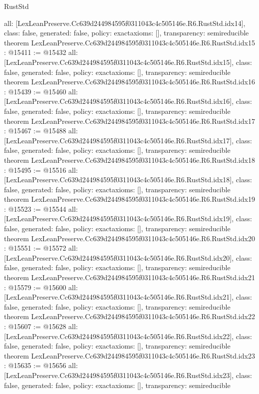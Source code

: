 \begin{lexlean}{RustStd}
\begin{coremodule}
{  all: [LexLeanPreserve.Cc639d244984595f0311043c4c505146e.R6.RustStd.idx14],
  class: false,
  generated: false,
  policy: exact{axioms: []},
  transparency: semireducible
}
theorem LexLeanPreserve.Cc639d244984595f0311043c4c505146e.R6.RustStd.idx15 : @15411 := @15432 {
  all: [LexLeanPreserve.Cc639d244984595f0311043c4c505146e.R6.RustStd.idx15],
  class: false,
  generated: false,
  policy: exact{axioms: []},
  transparency: semireducible
}
theorem LexLeanPreserve.Cc639d244984595f0311043c4c505146e.R6.RustStd.idx16 : @15439 := @15460 {
  all: [LexLeanPreserve.Cc639d244984595f0311043c4c505146e.R6.RustStd.idx16],
  class: false,
  generated: false,
  policy: exact{axioms: []},
  transparency: semireducible
}
theorem LexLeanPreserve.Cc639d244984595f0311043c4c505146e.R6.RustStd.idx17 : @15467 := @15488 {
  all: [LexLeanPreserve.Cc639d244984595f0311043c4c505146e.R6.RustStd.idx17],
  class: false,
  generated: false,
  policy: exact{axioms: []},
  transparency: semireducible
}
theorem LexLeanPreserve.Cc639d244984595f0311043c4c505146e.R6.RustStd.idx18 : @15495 := @15516 {
  all: [LexLeanPreserve.Cc639d244984595f0311043c4c505146e.R6.RustStd.idx18],
  class: false,
  generated: false,
  policy: exact{axioms: []},
  transparency: semireducible
}
theorem LexLeanPreserve.Cc639d244984595f0311043c4c505146e.R6.RustStd.idx19 : @15523 := @15544 {
  all: [LexLeanPreserve.Cc639d244984595f0311043c4c505146e.R6.RustStd.idx19],
  class: false,
  generated: false,
  policy: exact{axioms: []},
  transparency: semireducible
}
theorem LexLeanPreserve.Cc639d244984595f0311043c4c505146e.R6.RustStd.idx20 : @15551 := @15572 {
  all: [LexLeanPreserve.Cc639d244984595f0311043c4c505146e.R6.RustStd.idx20],
  class: false,
  generated: false,
  policy: exact{axioms: []},
  transparency: semireducible
}
theorem LexLeanPreserve.Cc639d244984595f0311043c4c505146e.R6.RustStd.idx21 : @15579 := @15600 {
  all: [LexLeanPreserve.Cc639d244984595f0311043c4c505146e.R6.RustStd.idx21],
  class: false,
  generated: false,
  policy: exact{axioms: []},
  transparency: semireducible
}
theorem LexLeanPreserve.Cc639d244984595f0311043c4c505146e.R6.RustStd.idx22 : @15607 := @15628 {
  all: [LexLeanPreserve.Cc639d244984595f0311043c4c505146e.R6.RustStd.idx22],
  class: false,
  generated: false,
  policy: exact{axioms: []},
  transparency: semireducible
}
theorem LexLeanPreserve.Cc639d244984595f0311043c4c505146e.R6.RustStd.idx23 : @15635 := @15656 {
  all: [LexLeanPreserve.Cc639d244984595f0311043c4c505146e.R6.RustStd.idx23],
  class: false,
  generated: false,
  policy: exact{axioms: []},
  transparency: semireducible
}
\end{coremodule}
\end{lexlean}
